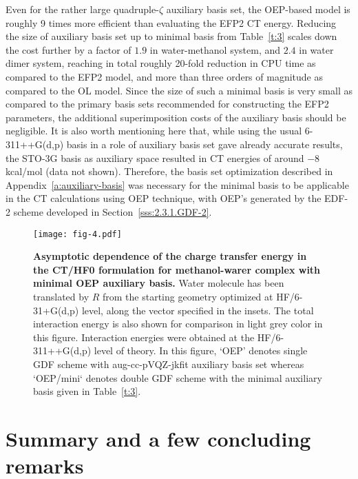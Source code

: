 \documentclass[aip,jcp,amsmath,amssymb,reprint,floatfix]{revtex4-1}
\begin{document}
Even for the rather large quadruple\hyp{}$\zeta$ auxiliary basis set,
the OEP\hyp{}based model is roughly 9 times more efficient than evaluating the EFP2 CT energy.
Reducing the size of auxiliary basis set up to minimal basis from Table~\ref{t:3}
scales down the cost further by a factor of $1.9$ in water-methanol system,
and $2.4$ in water dimer system, reaching in total roughly 20\hyp{}fold
reduction in CPU time as compared to the EFP2 model, and more than three orders of magnitude
as compared to the OL model. Since the size of such a minimal basis
is very small as compared to the primary basis sets recommended for constructing
the EFP2 parameters, the additional superimposition costs of the auxiliary basis
should be negligible.
It is also worth mentioning here that, while using the usual 6-311++G(d,p) basis
in a role of auxiliary basis set 
gave already accurate results, the STO-3G basis as auxiliary space resulted
in CT energies of around $-8$ kcal/mol (data not shown). Therefore, the basis set optimization
described in Appendix~\ref{a:auxiliary-basis} was necessary for the minimal basis to be applicable
in the CT calculations using OEP technique, with OEP's generated by the EDF-2 scheme
developed in Section~\ref{sss:2.3.1.GDF-2}. 
%
%
\begin{figure}[t]
\texttt{[image: fig-4.pdf]}
\caption{\label{f:fig-4} {\bf Asymptotic dependence of the charge transfer energy
in the CT/HF0 formulation for methanol-warer complex with minimal OEP auxiliary basis.} 
Water molecule has been translated by $R$ from the starting geometry
optimized at HF/6-31+G(d,p) level,
along the vector specified in the insets.
The total interaction energy
is also shown for comparison in light grey color in this figure.
Interaction energies were obtained at the HF/6-311++G(d,p) level of theory.
In this figure, `OEP' denotes single GDF scheme with aug-cc-pVQZ-jkfit auxiliary basis set
whereas `OEP/mini` denotes double GDF scheme with the minimal auxiliary basis
given in Table~\ref{t:3}.
} 
\end{figure}
%



\section{\label{s:6.conclusions}Summary and a few concluding remarks}
\end{document}
